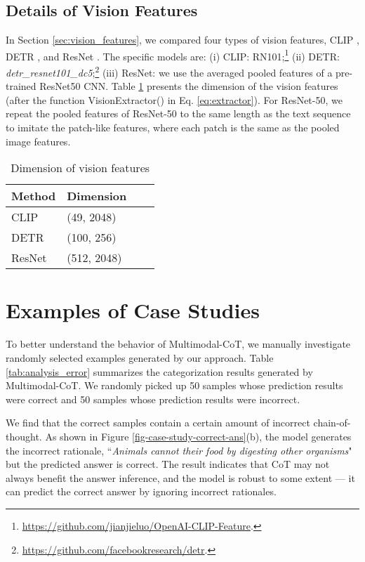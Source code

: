 \documentclass[nohyperref]{article}
\theoremstyle{plain}
\theoremstyle{definition}
\theoremstyle{remark}
\begin{document}
\subsection{Details of Vision Features}\label{appendix:vision_features}
In Section \ref{sec:vision_features}, we compared four types of vision features, CLIP \citep{radford2021learning}, DETR \citep{carion2020end}, and ResNet \citep{he2016deep}. The specific models are: (i) CLIP: RN101;\footnote{\url{https://github.com/jianjieluo/OpenAI-CLIP-Feature}.} (ii) DETR: \textit{detr\_resnet101\_dc5};\footnote{\url{https://github.com/facebookresearch/detr}.} (iii) ResNet: we use the averaged pooled features of a pre-trained ResNet50 CNN. Table \ref{tab:visual_dimension} presents the dimension of the vision features (after the function \textrm{VisionExtractor}() in Eq. \ref{eq:extractor}). For ResNet-50, we repeat the 
pooled features of ResNet-50 to the same length as the text sequence to imitate the patch-like features, where each patch is the same as the pooled image features. 

\begin{table}[htb]
\centering\small
        \caption{Dimension of vision features\label{tab:visual_dimension}}
\begin{tabular}{llcc}\toprule
 {Method} & {Dimension} \\\midrule
 \quad  CLIP & (49, 2048) \\
 \quad  DETR& (100, 256) \\
 \quad  ResNet & (512, 2048) \\
\bottomrule
\end{tabular}
\end{table}

\section{Examples of Case Studies}\label{appendix:case_study}
To better understand the behavior of Multimodal-CoT, we manually investigate randomly selected examples generated by our approach. Table \ref{tab:analysis_error} summarizes the categorization results generated by Multimodal-CoT. We randomly picked up 50 samples whose prediction results were correct and 50 samples whose prediction results were incorrect.

We find that the correct samples contain a certain amount of incorrect chain-of-thought.
As shown in Figure \ref{fig-case-study-correct-ans}(b), the model generates the incorrect rationale, ``\textit{Animals cannot their food by digesting other organisms}" but the predicted answer is correct. The result indicates that CoT may not always benefit the answer inference, and the model is robust to some extent --- it can predict the correct answer by ignoring incorrect rationales.
\end{document}
